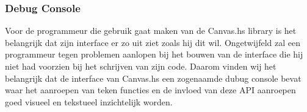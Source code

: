 \subsubsection{Debug Console}
Voor de programmeur die gebruik gaat maken van de Canvas.hs library is het belangrijk dat zijn interface er zo uit ziet zoals hij dit wil. Ongetwijfeld zal een programmeur tegen problemen aanlopen bij het bouwen van de interface die hij niet had voorzien bij het schrijven van zijn code. Daarom vinden wij het belangrijk dat de interface van Canvas.hs een zogenaamde dubug console bevat waar het aanroepen van teken functies en de invloed van deze API aanroepen goed visueel en tekstueel inzichtelijk worden.
